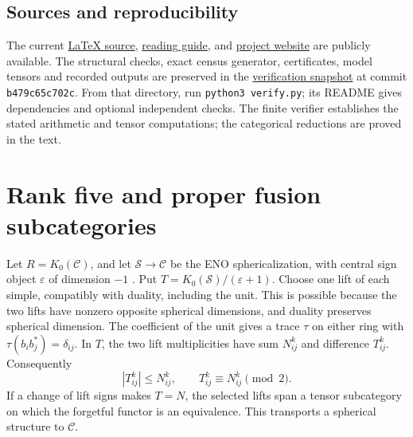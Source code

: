 \documentclass[11pt,a4paper]{article}
\numberwithin{equation}{section}
\begin{document}
\subsection*{Sources and reproducibility}
The current \href{https://github.com/sebastienpalcoux/grothendieck-ring-classification/blob/main/manuscripts/rank5.tex}{LaTeX source},
\href{https://github.com/sebastienpalcoux/grothendieck-ring-classification/blob/main/manuscripts/rank5/README.md}{reading guide},
and \href{https://sebastienpalcoux.github.io/grothendieck-ring-classification/}{project website}
are publicly available. The structural checks, exact census generator,
certificates, model tensors and recorded outputs are preserved in the
\href{https://github.com/sebastienpalcoux/grothendieck-ring-classification/tree/b479c65c702c6a09a674df7c2f8468b1a48915d3/supplements/rank5/sharp}{verification snapshot}
at commit \texttt{b479c65c702c}. From that directory, run
\texttt{python3 verify.py}; its README gives dependencies and optional
independent checks. The finite verifier establishes the stated arithmetic
and tensor computations; the categorical reductions are proved in the text.


\section{Rank five and proper fusion subcategories}

Let $R=K_0(\mathcal C)$, and let $\mathcal S\to\mathcal C$ be the ENO
sphericalization, with central sign object $\varepsilon$ of dimension $-1$
\cite[Remark~3.1 and Proposition~5.14]{ENO}. Put $T=K_0(\mathcal S)/(\varepsilon+1)$.
Choose one lift of each simple, compatibly with duality, including the unit.
This is possible because the two lifts have nonzero opposite spherical
dimensions, and duality preserves spherical dimension. The coefficient of the
unit gives a trace $\tau$ on either ring with
$\tau(b_i b_j^*)=\delta_{ij}$. In $T$, the two lift multiplicities have
sum $N_{ij}^k$ and difference $T_{ij}^k$. Consequently
\[
 |T_{ij}^k|\leq N_{ij}^k,\qquad T_{ij}^k\equiv N_{ij}^k\pmod 2.
\]
If a change of lift signs makes $T=N$, the selected lifts span a tensor
subcategory on which the forgetful functor is an equivalence. This transports
a spherical structure to $\mathcal C$.
\end{document}
